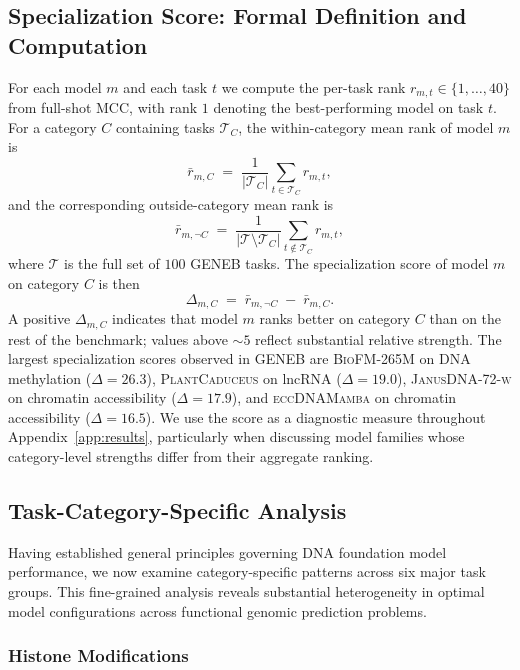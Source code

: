 \documentclass{article}
\theoremstyle{plain}
\theoremstyle{definition}
\theoremstyle{remark}
\begin{document}
\subsection{Specialization Score: Formal Definition and Computation}
\label{subsec:specialization}

For each model $m$ and each task $t$ we compute the per-task rank
$r_{m,t} \in \{1, \ldots, 40\}$ from full-shot MCC, with rank $1$
denoting the best-performing model on task $t$. For a category
$C$ containing tasks $\mathcal{T}_C$, the within-category mean rank
of model $m$ is
\[
\bar{r}_{m,C} \;=\; \frac{1}{|\mathcal{T}_C|}\sum_{t\in\mathcal{T}_C} r_{m,t},
\]
and the corresponding outside-category mean rank is
\[
\bar{r}_{m,\neg C} \;=\; \frac{1}{|\mathcal{T}\setminus\mathcal{T}_C|}\sum_{t\notin\mathcal{T}_C} r_{m,t},
\]
where $\mathcal{T}$ is the full set of $100$ GENEB tasks. The
specialization score of model $m$ on category $C$ is then
\[
\Delta_{m,C} \;=\; \bar{r}_{m,\neg C} \;-\; \bar{r}_{m,C}.
\]
A positive $\Delta_{m,C}$ indicates that model $m$ ranks better on
category $C$ than on the rest of the benchmark; values above $\sim 5$
reflect substantial relative strength. The largest specialization
scores observed in GENEB are
\textsc{BioFM-265M} on DNA methylation ($\Delta = 26.3$),
\textsc{PlantCaduceus} on lncRNA ($\Delta = 19.0$),
\textsc{JanusDNA-72-w} on chromatin accessibility ($\Delta = 17.9$),
and \textsc{eccDNAMamba} on chromatin accessibility ($\Delta = 16.5$).
We use the score as a diagnostic measure throughout
Appendix~\ref{app:results}, particularly when discussing model families
whose category-level strengths differ from their aggregate ranking.

\newpage

\subsection{Task-Category-Specific Analysis}
\label{subsec:task_categories}

Having established general principles governing DNA foundation model performance, we now examine category-specific patterns across six major task groups. This fine-grained analysis reveals substantial heterogeneity in optimal model configurations across functional genomic prediction problems.

\subsubsection{Histone Modifications}
\end{document}

